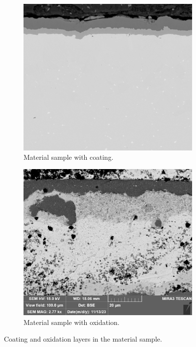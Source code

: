 \begin{figure}[H]
    \centering
    \begin{subfigure}{0.40\textwidth}
        \centering
        \includegraphics[width=\linewidth]{PICTURES/intro/115.png}
        \caption{Material sample with coating.}
        \label{fig:coating}
    \end{subfigure}
    \hfill
    \begin{subfigure}{0.40\textwidth}
        \centering
        \includegraphics[width=\linewidth]{PICTURES/intro/625_3500h_low_cross_strana1_13.png}
        \caption{Material sample with oxidation.}
        \label{fig:oxidation}
    \end{subfigure}
    \caption{Coating and oxidation layers in the material sample.}
    \label{fig:coating-oxidation}
\end{figure}



